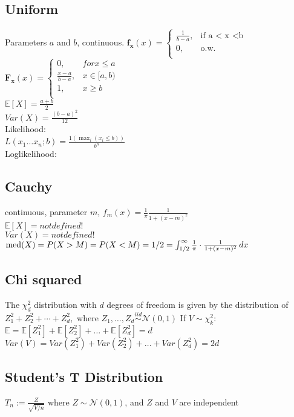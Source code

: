 \subsection*{Uniform}
Parameters $a$ and $b$, continuous.
$ \mathbf{f_x}(x)=
	\begin{cases}
		 \frac{1}{b-a},&\text{if a < x <b}\\
		0,&\text{o.w.}\\
	\end{cases}
$\\
$ \mathbf{F_x}(x)=
	\begin{cases}
		 0,&for x \leq a\\
		 \frac{x-a}{b-a},& x \in [a,b)\\
		1,&x \geq b\\
	\end{cases}
$\\
$\mathbb{E}[X]=\frac{a+b}{2}$\\
$Var(X)=\frac{(b-a)^2}{12}$\\
Likelihood:\\
$L(x_1\dots x_n;b)=\frac{1(\max_i (x_i \leq b))} {b^n}$\\
Loglikelihood:\\
\subsection*{Cauchy}
continuous, parameter $m$,
$f_ m(x) = \frac{1}{\pi } \frac{1}{1 + (x - m)^2}$\\
$\mathbb{E}[X]=not defined!$\\
$Var(X)=not defined!$\\
$\text {med}(X) = P(X > M) = P(X < M)\\ = 1/2 = \displaystyle \int _{1/2}^{\infty } \frac{1}{\pi } \cdot \frac{1}{1 + (x-m)^2} \,  dx$ \\
\subsection*{Chi squared}
The $\chi _ d^2$ distribution with $d$ degrees of freedom is given by the distribution of $Z_1^2 + Z_2^2 + \cdots + Z_ d^2,$ where $Z_1, \ldots , Z_ d \stackrel{iid}{\sim } \mathcal{N}(0,1)$
If $V \sim \chi^2_k:$\\
$\mathbb{E}= \mathbb{E}[Z_1^2] + \mathbb{E}[Z_2^2] + \ldots + \mathbb{E}[Z_d^2] = d$\\
$Var(V) = Var(Z_1^2) + Var(Z_2^2) + \ldots + Var(Z_d^2) = 2d$
\subsection*{Student's T Distribution}
$T_ n := \frac{Z}{\sqrt{V/n}}$ where $Z \sim \mathcal{N}(0,1)$, and $Z$ and $V$ are independent